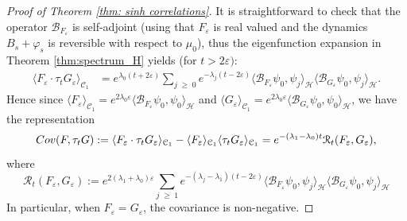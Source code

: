 \documentclass[11pt]{amsart}
\numberwithin{equation}{section}
\theoremstyle{definition}
\renewcommand{\geq}{\;\geqslant\;}                   %
\newcommand{\cjd}{\rangle}
\newcommand{\cjg}{\langle}
\newcommand{\mc}{\mathcal}
\newcommand{\la}{\lambda}
\def\eps{\varepsilon}
\begin{document}
\begin{proof}[Proof of Theorem \ref{thm: sinh correlations}]
It is straightforward to check that the operator $\mc{B}_{F_\eps}$ is self-adjoint (using that $F_\eps$ is real valued and the 
dynamics $B_s+\varphi_s$ is reversible with respect to $\mu_0$), thus the eigenfunction expansion in Theorem \ref{thm:spectrum_H} yields (for $t>2\eps)$: 
\[\begin{split}
\langle F_\eps \cdot \tau_{t} G_\eps \rangle_{\mathcal C_1} &= e^{\lambda_0(t+2\eps)} \sum_{j \geq 0} e^{-\lambda_j (t-2\eps)} \langle  \mc{B}_{F_\eps}\psi_0,\psi_j \rangle_{\mathcal H} \langle \mc{B}_{G_\eps}\psi_0,\psi_j\rangle_{\mathcal H}.
\end{split}\]
Hence since $\langle F_\eps \rangle_{\mathcal C_1}=e^{2\la_0\eps}\cjg \mc{B}_{F_\eps}\psi_0,\psi_0\cjd_{\mc{H}}$ and $\langle G_\eps \rangle_{\mathcal C_1}=e^{2\la_0\eps}\cjg \mc{B}_{G_\eps}\psi_0,\psi_0\cjd_{\mc{H}}$,
we have the representation
\begin{equation} \label{eq: covariances}
{\rm Cov}(F,\tau_t G) := \langle F_\eps \cdot \tau_tG_\eps \rangle_{\mathcal C_1} - \langle F_\eps \rangle_{\mathcal C_1} \langle \tau_t G_\eps \rangle_{\mathcal C_1} = e^{-(\lambda_1-\lambda_0)t} \mathcal R_t(F_\eps, G_\eps),
\end{equation}
where
\begin{equation}
\mathcal R_t(F_\eps, G_\eps):= e^{2(\lambda_1+\lambda_0)\eps} \sum_{j \geq 1} e^{-(\lambda_j - \lambda_1)(t-2\eps)} \langle  \mc{B}_{F_\eps}\psi_0,\psi_j \rangle_{\mathcal H} \langle \mc{B}_{G_\eps}\psi_0,\psi_j\rangle_{\mathcal H} 
\end{equation}
In particular, when $F_\eps = G_\eps$, the covariance is non-negative. 



\end{proof}
\end{document}
